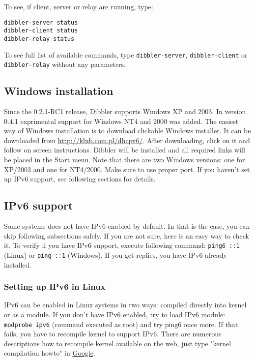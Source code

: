 To see, if client, server or relay are running, type:

\begin{verbatim}
dibbler-server status
dibbler-client status
dibbler-relay status
\end{verbatim}

To see full list of available commands, type \verb+dibbler-server+, 
\verb+dibbler-client+ or \verb+dibbler-relay+ without any parameters.

\subsection{Windows installation}
Since the 0.2.1-RC1 release, Dibbler supports Windows XP and 2003. In version
0.4.1 exprimental support for Windows NT4 and 2000 was added. The easiest
way of Windows installation is to download clickable Windows installer. It can be downloaded from
\url{http://klub.com.pl/dhcpv6/}. After downloading, click on it and
follow on screen instructions. Dibbler will be installed and all
required links will be placed in the Start menu. Note that there are
two Windows versions: one for XP/2003 and one for NT4/2000. Make sure
to use proper port. If you haven't set up IPv6 support, see following
sections for details.

\subsection{IPv6 support}
Some systems does not have IPv6 enabled by default. In that is the case,
you can skip following subsections safely. If you are not sure, here is
an easy way to check it. To verify if you have IPv6 support, execute
following command: \verb+ping6 ::1+ (Linux) or \verb+ping ::1+
(Windows). If you get replies, you have IPv6 already installed.

\subsubsection{Setting up IPv6 in Linux}
IPv6 can be enabled in Linux systems in two ways: compiled directly
into kernel or as a module. If you don't have IPv6 enabled, try to load IPv6 module:
\verb+modprobe ipv6+ (command executed as root) and try ping6 once more. If that
fails, you have to recompile kernel to support IPv6. There are 
numerous descriptions how to recompile kernel available on the web, just
type "kernel compilation howto" in \href{http://www.google.com}{Google}.

